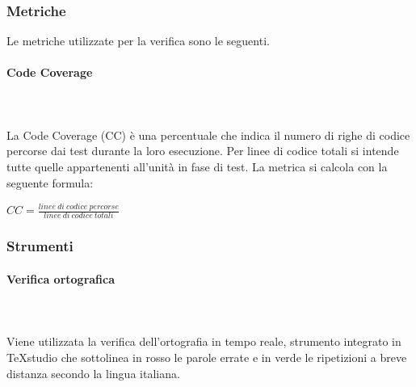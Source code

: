 		
	\subsubsection{Metriche}
	Le metriche utilizzate per la verifica sono le seguenti.
		\paragraph{Code Coverage}\mbox{}\\ \mbox{}\\
		La Code Coverage (CC) è una percentuale che indica il numero di righe di codice percorse dai test durante la loro	esecuzione. Per linee di codice totali si intende tutte quelle appartenenti all'unità in fase di test. La metrica si calcola con la seguente formula:
			\begin{center}
				$CC = \frac{linee\ di\ codice\ percorse}{linee\ di\ codice\ totali}$
			\end{center}
			
	\subsubsection{Strumenti}
		\paragraph{Verifica ortografica} \mbox{}\\ \mbox{}\\
		Viene utilizzata la verifica dell'ortografia in tempo reale, strumento integrato in \TeX{}studio che sottolinea in rosso le parole errate e in verde le ripetizioni a breve distanza secondo la lingua italiana.
